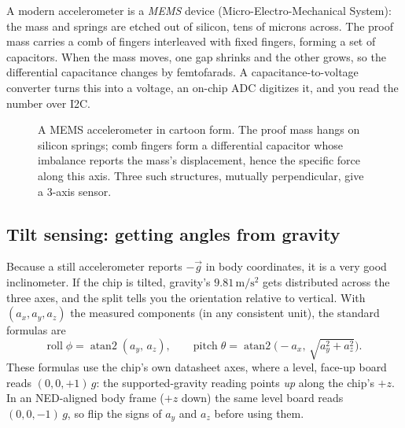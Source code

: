 A modern accelerometer is a \emph{MEMS} device (Micro-Electro-Mechanical System): the
mass and springs are etched out of silicon, tens of microns across. The proof mass
carries a comb of fingers interleaved with fixed fingers, forming a set of capacitors.
When the mass moves, one gap shrinks and the other grows, so the differential
capacitance changes by femtofarads. A capacitance-to-voltage converter turns this into
a voltage, an on-chip ADC digitizes it, and you read the number over I2C.

\begin{figure}[H]
\centering
{}
\caption{A MEMS accelerometer in cartoon form. The proof mass hangs on silicon
springs; comb fingers form a differential capacitor whose imbalance reports the
mass's displacement, hence the specific force along this axis. Three such structures,
mutually perpendicular, give a 3-axis sensor.}
\label{ch34:fig-mems-accel}
\end{figure}

\subsection{Tilt sensing: getting angles from gravity}

Because a still accelerometer reports $-\vec g$ in body coordinates, it is a very good
inclinometer. If the chip is tilted, gravity's $9.81\,\mathrm{m/s^2}$ gets distributed
across the three axes, and the split tells you the orientation relative to vertical.
With $(a_x,a_y,a_z)$ the measured components (in any consistent unit), the standard
formulas are
\[
  \text{roll}\;\phi = \operatorname{atan2}(a_y,\,a_z), \qquad
  \text{pitch}\;\theta = \operatorname{atan2}\!\big(-a_x,\,\sqrt{a_y^2+a_z^2}\big).
\]
These formulas use the chip's own datasheet axes, where a level, face-up board reads
$(0,0,+1)\,g$: the supported-gravity reading points \emph{up} along the chip's $+z$. In
an NED-aligned body frame ($+z$ down) the same level board reads $(0,0,-1)\,g$, so flip
the signs of $a_y$ and $a_z$ before using them.

